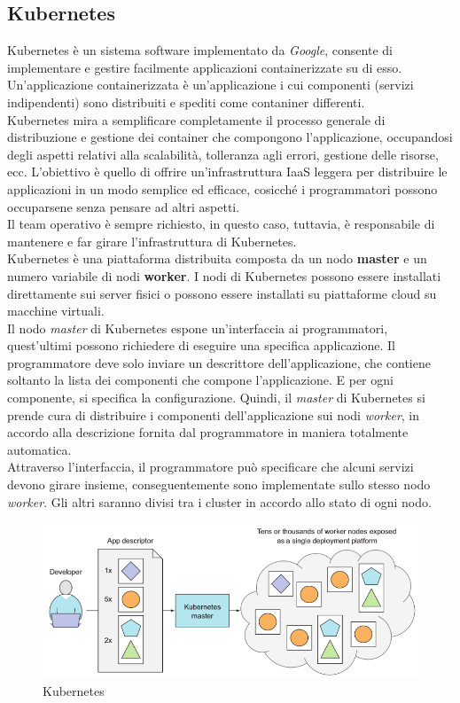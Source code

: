 \documentclass{article}
\begin{document}
\subsection{Kubernetes}
Kubernetes è un sistema software implementato da \textit{Google}, consente di implementare e gestire facilmente applicazioni containerizzate su di esso. \\ Un'applicazione containerizzata è un'applicazione i cui componenti (servizi indipendenti) sono distribuiti e spediti come contaniner differenti. \\
Kubernetes mira a semplificare completamente il processo generale di distribuzione e gestione dei container che compongono l'applicazione, occupandosi degli aspetti relativi alla scalabilità, tolleranza agli errori, gestione delle risorse, ecc. L'obiettivo è quello di offrire un'infrastruttura IaaS leggera per distribuire le applicazioni in un modo semplice ed efficace, cosicché i programmatori possono occuparsene senza pensare ad altri aspetti. \\ 
Il team operativo è sempre richiesto, in questo caso, tuttavia, è responsabile di mantenere e far girare l'infrastruttura di Kubernetes. \\
Kubernetes è una piattaforma distribuita composta da un nodo \textbf{master} e un numero variabile di nodi \textbf{worker}. I nodi di Kubernetes possono essere installati direttamente sui server fisici o possono essere installati su piattaforme cloud su macchine virtuali. \\
Il nodo \textit{master} di Kubernetes espone un'interfaccia ai programmatori, quest'ultimi possono richiedere di eseguire una specifica applicazione. Il programmatore deve solo inviare un descrittore dell'applicazione, che contiene soltanto la lista dei componenti che compone l'applicazione. E per ogni componente, si specifica la configurazione. Quindi, il \textit{master} di Kubernetes si prende cura di distribuire i componenti dell'applicazione sui nodi \textit{worker}, in accordo alla descrizione fornita dal programmatore in maniera totalmente automatica. \\
Attraverso l'interfaccia, il programmatore può specificare che alcuni servizi devono girare insieme, conseguentemente sono implementate sullo stesso nodo \textit{worker}. Gli altri saranno divisi tra i cluster in accordo allo stato di ogni nodo. 
\begin{figure}[H]
    \centering
    \includegraphics[scale=0.4]{img/kubernetes.png}
    \caption{Kubernetes}
\end{figure}\noindent
\end{document}
